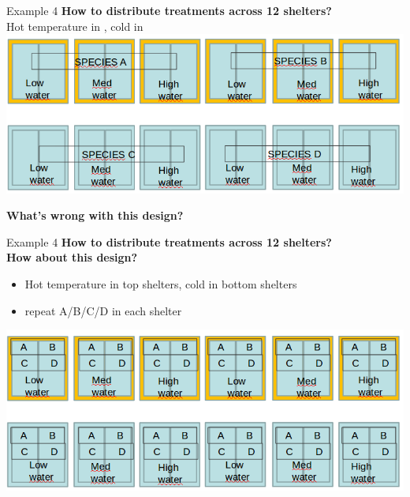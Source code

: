 \documentclass{beamer}
\begin{document}
\begin{frame}{Example 4}
\textbf{How to distribute treatments across 12 shelters?\\}
 Hot temperature in {\color{orange}{orange}}, cold in {\color{blue!50!green}{turquoise}}\\
  \centering
  \includegraphics[width=\textwidth]{Figures/shelters2}
  
  \pause
  \vspace{0.1cm}
  \textbf{What’s wrong with this design?}
\end{frame}



\begin{frame}{Example 4}
\textbf{How to distribute treatments across 12 shelters?\\ How about this design?}
\begin{itemize}
 \item Hot temperature in top shelters, cold in bottom shelters
 \item repeat A/B/C/D in each shelter
\end{itemize}

  \centering
  \includegraphics[width=\textwidth]{Figures/shelters3}
\end{frame}
\end{document}
